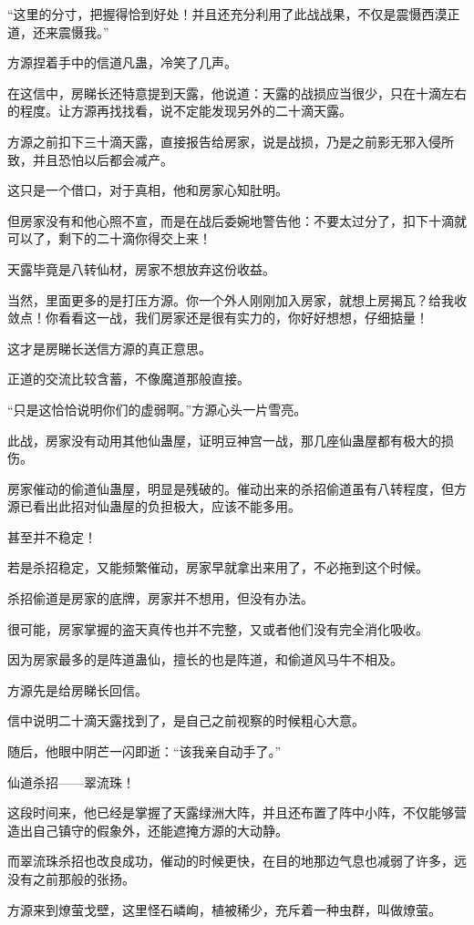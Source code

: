 \begin{this_body}
“这里的分寸，把握得恰到好处！并且还充分利用了此战战果，不仅是震慑西漠正道，还来震慑我。”

方源捏着手中的信道凡蛊，冷笑了几声。

在这信中，房睇长还特意提到天露，他说道：天露的战损应当很少，只在十滴左右的程度。让方源再找找看，说不定能发现另外的二十滴天露。

方源之前扣下三十滴天露，直接报告给房家，说是战损，乃是之前影无邪入侵所致，并且恐怕以后都会减产。

这只是一个借口，对于真相，他和房家心知肚明。

但房家没有和他心照不宣，而是在战后委婉地警告他：不要太过分了，扣下十滴就可以了，剩下的二十滴你得交上来！

天露毕竟是八转仙材，房家不想放弃这份收益。

当然，里面更多的是打压方源。你一个外人刚刚加入房家，就想上房揭瓦？给我收敛点！你看看这一战，我们房家还是很有实力的，你好好想想，仔细掂量！

这才是房睇长送信方源的真正意思。

正道的交流比较含蓄，不像魔道那般直接。

“只是这恰恰说明你们的虚弱啊。”方源心头一片雪亮。

此战，房家没有动用其他仙蛊屋，证明豆神宫一战，那几座仙蛊屋都有极大的损伤。

房家催动的偷道仙蛊屋，明显是残破的。催动出来的杀招偷道虽有八转程度，但方源已看出此招对仙蛊屋的负担极大，应该不能多用。

甚至并不稳定！

若是杀招稳定，又能频繁催动，房家早就拿出来用了，不必拖到这个时候。

杀招偷道是房家的底牌，房家并不想用，但没有办法。

很可能，房家掌握的盗天真传也并不完整，又或者他们没有完全消化吸收。

因为房家最多的是阵道蛊仙，擅长的也是阵道，和偷道风马牛不相及。

方源先是给房睇长回信。

信中说明二十滴天露找到了，是自己之前视察的时候粗心大意。

随后，他眼中阴芒一闪即逝：“该我亲自动手了。”

仙道杀招——翠流珠！

这段时间来，他已经是掌握了天露绿洲大阵，并且还布置了阵中小阵，不仅能够营造出自己镇守的假象外，还能遮掩方源的大动静。

而翠流珠杀招也改良成功，催动的时候更快，在目的地那边气息也减弱了许多，远没有之前那般的张扬。

方源来到燎萤戈壁，这里怪石嶙峋，植被稀少，充斥着一种虫群，叫做燎萤。


\end{this_body}
